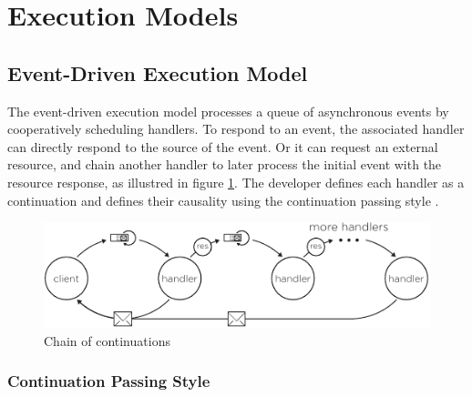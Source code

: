 \section{Execution Models} \label{chapter4:execution-models}

\subsection{Event-Driven Execution Model} \label{chapter4:event-driven}

The event-driven execution model processes a queue of asynchronous events by cooperatively scheduling handlers.
To respond to an event, the associated handler can directly respond to the source of the event.
Or it can request an external resource, and chain another handler to later process the initial event with the resource response, as illustred in figure \ref{fig:cont-chain}.
The developer defines each handler as a continuation and defines their causality using the continuation passing style \cite{Wand1980,Haynes1984}.

\begin{figure}[h!]
  \centering
  \includegraphics[width=0.7\linewidth]{../resources/cont-chain.pdf}
  \caption{Chain of continuations}
  \label{fig:cont-chain}
\end{figure}

\subsubsection{Continuation Passing Style} \label{chapter4:event-loop:continuation}



